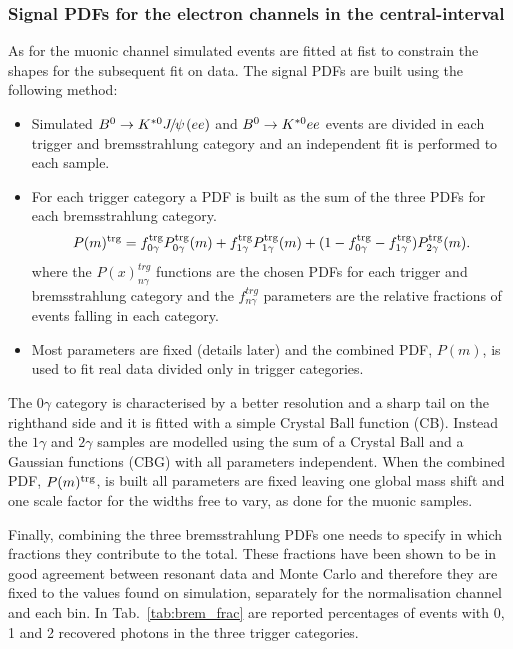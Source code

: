\subsubsection{Signal PDFs for the electron channels in the central-\qsq interval}
\label{sec:fit_ee_central}

As for the muonic channel simulated events are fitted at fist to constrain
the shapes for the subsequent fit on data. The signal PDFs are built using the following method:
%
\begin{itemize}
\item Simulated $\Bz\to\Kstarz\jpsi(ee)$ and ${{B}^0}\rightarrow{\ensuremath{{K}^{*0}}} ee$ events are divided
in each trigger and bremsstrahlung category and an independent fit is performed to each sample.
\item For each trigger category a PDF is built as the sum of the three PDFs for each bremsstrahlung category.
\begin{equation}
P(m)^{\rm trg} = f^{\rm trg}_{0\gamma} P^{\rm trg}_{0\gamma}(m) + f^{\rm trg}_{1\gamma} P^{\rm trg}_{1\gamma}(m) + (1 - f^{\rm trg}_{0\gamma} - f^{\rm trg}_{1\gamma}) P^{\rm trg}_{2\gamma}(m).
\end{equation}
where the $P(x)^{trg}_{n\gamma}$ functions are the chosen PDFs for each trigger and bremsstrahlung category
and the $f^{trg}_{n\gamma}$ parameters are the relative fractions of events falling in each category.
\item Most parameters are fixed (details later) and the combined PDF, $P(m)$,
is used to fit real data divided only in trigger categories.
\end{itemize}

The $0\gamma$ category is characterised by a better resolution and a sharp tail on the righthand
side and it is fitted with a simple Crystal Ball function (CB). Instead the $1\gamma$ and $2\gamma$
samples are modelled using the sum of a Crystal Ball and a Gaussian functions (CBG) with all parameters independent.
When the combined PDF, $P(m)^{\rm trg}$, is built all parameters are fixed leaving one global mass shift 
and one scale factor for the widths free to vary, as done for the muonic samples.

Finally, combining the three bremsstrahlung PDFs one needs to specify in which fractions they
contribute to the total. These fractions have been shown to be in good agreement between 
resonant data and Monte Carlo
and therefore they are fixed to the values found on simulation, separately for the normalisation
channel and each \qsq bin. In Tab.~\ref{tab:brem_frac} are reported percentages of events
with 0, 1 and 2 recovered photons in the three trigger categories.

